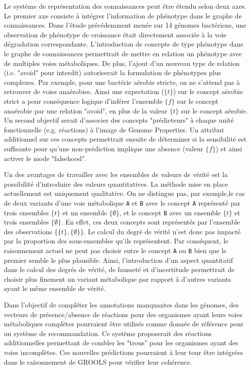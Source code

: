 \begin{refsegment}
Le système de représentation des connaissances peut être étendu selon deux axes. Le premier axe consiste à intégrer l'information de phénotype dans le graphe de connaissances. Dans l'étude précédemment menée sur 14 génomes bactériens, une observation de phénotype de croissance était directement associée à la voie dégradation correspondante. L'introduction de concepts de type phénotype dans le graphe de connaissances permettrait de mettre en relation un phénotype avec de multiples voies métaboliques. De plus, l'ajout d'un nouveau type de relation (i.e. "avoid" pour interdit) autoriserait la formulation de phénotypes plus complexes. Par exemple, pour une bactérie aérobie stricte, on ne s'attend pas à retrouver de voies anaérobies. Ainsi une expectation ($\{t\}$) sur le concept aérobie strict a pour conséquence logique d'inférer l'ensemble $\{f\}$ sur le concept anaérobie par une relation "avoid", en plus de la valeur $\{t\}$ sur le concept aérobie. Un second objectif serait d'associer des concepts "prédicteurs" à chaque unité fonctionnelle (e.g. réactions) à l'image de Genome Properties. Un attribut additionnel sur ces concepts permettrait ensuite de déterminer si la sensibilité est suffisante pour qu'une non-prédiction implique une absence (valeur $\{f\}$) et ainsi activer le mode "falsehood". 

Un des avantages de travailler avec les ensembles de valeurs de vérité est la possibilité d'introduire des valeurs quantitatives. La méthode mise en place actuellement est uniquement qualitative. On ne distingue pas, par exemple,le cas de deux variants d'une voie métabolique \texttt{A} et \texttt{B} avec le concept \texttt{A} représenté par trois ensembles $\{t\}$ et un ensemble $\{\emptyset\}$, et le concept \texttt{B} avec un ensemble $\{t\}$ et trois ensembles $\{\emptyset\}$. En effet, ces deux concepts sont représentés par l'ensemble des observations $\{\{t\},\{\emptyset\}\}$. Le calcul du degré de vérité n'est donc pas impacté par la proportion des sous-ensembles qu'ils représentent. Par conséquent, le raisonnement actuel ne peut pas choisir entre le concept \texttt{A} ou \texttt{B} bien que le premier semble le plus plausible. Ainsi, l'introduction d'un aspect quantitatif dans le calcul des degrés de vérité, de fausseté et d'incertitude permettrait de choisir plus finement un variant métabolique par rapport à d'autres variants ayant le même ensemble de vérité.

Dans l'objectif de compléter les annotations manquantes dans les génomes, des vecteurs de présence/absence de réactions pour des organismes ayant leurs voies métaboliques complètes pourraient être utilisés comme donnée de référence pour un système de recommandation. Ce système proposerait des réactions additionnelles permettant de combler les "trous" pour les organismes ayant des voies incomplètes. Ces nouvelles prédictions pourraient à leur tour être intégrées dans le raisonnement de GROOLS pour vérifier leur cohérence.


\end{refsegment}
